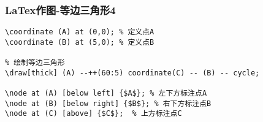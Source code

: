 \begin{frame}[fragile]
\frametitle{LaTex作图-等边三角形4}

\begin{verbatim}
\coordinate (A) at (0,0); % 定义点A 
\coordinate (B) at (5,0); % 定义点B

% 绘制等边三角形
\draw[thick] (A) --++(60:5) coordinate(C) -- (B) -- cycle;

\node at (A) [below left] {$A$}; % 左下方标注点A
\node at (B) [below right] {$B$}; % 右下方标注点B
\node at (C) [above] {$C$};  % 上方标注点C
\end{verbatim}
\end{frame}
